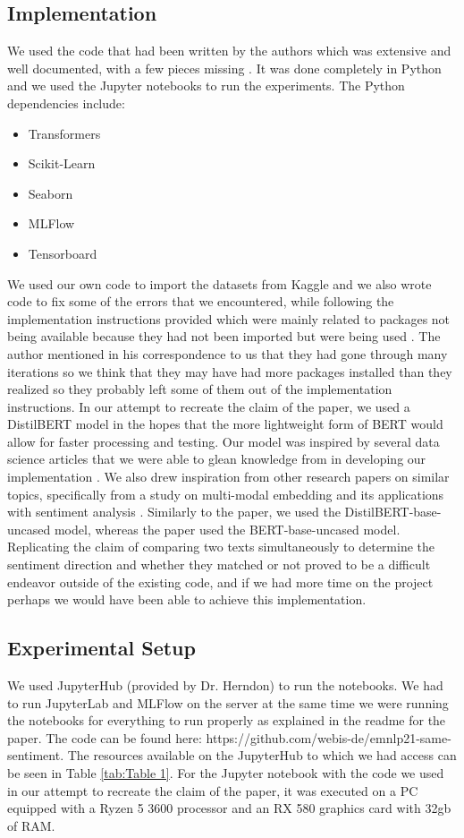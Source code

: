\documentclass[conference]{IEEEtran}
\begin{document}
\subsection{Implementation}
	We used the code that had been written by the authors which was extensive and well documented, with a few pieces missing \cite{source-repo}. It was done completely in Python and we used the Jupyter notebooks to run the experiments.
The Python dependencies include: 
\begin{itemize}
	\item{Transformers}
	\item{Scikit-Learn}
	\item{Seaborn}
	\item{MLFlow}
	\item{Tensorboard}
\end{itemize}
	We used our own code to import the datasets from Kaggle and we also wrote code to fix some of the errors that we encountered, while following the implementation instructions provided which were mainly related to packages not being available because they had not been imported but were being used \cite{project-repo}.  The author mentioned in his correspondence to us that they had gone through many iterations so we think that they may have had more packages installed than they realized so they probably left some of them out of the implementation instructions.
	In our attempt to recreate the claim of the paper, we used a DistilBERT model in the hopes that the more lightweight form of BERT would allow for faster processing and testing. Our model was inspired by several data science articles that we were able to glean knowledge from in developing our implementation \cite{tds-hugging-face} \cite{tds-yelp-reviews}. We also drew inspiration from other research papers on similar topics, specifically from a study on multi-modal embedding and its applications with sentiment analysis \cite{same-paper}. Similarly to the paper, we used the DistilBERT-base-uncased model, whereas the paper used the BERT-base-uncased model. Replicating the claim of comparing two texts simultaneously to determine the sentiment direction and whether they matched or not proved to be a difficult endeavor outside of the existing code, and if we had more time on the project perhaps we would have been able to achieve this implementation.

\subsection{Experimental Setup}
	We used JupyterHub (provided by Dr. Herndon) to run the notebooks. We had to run JupyterLab and MLFlow on the server at the same time we were running the notebooks for everything to run properly as explained in the readme for the paper.
The code can be found here: https://github.com/webis-de/emnlp21-same-sentiment. 
The resources available on the JupyterHub to which we had access can be seen in Table \ref{tab:Table 1}. For the Jupyter notebook with the code we used in our attempt to recreate the claim of the paper, it was executed on a PC equipped with a Ryzen 5 3600 processor and an RX 580 graphics card with 32gb of RAM.
\end{document}
